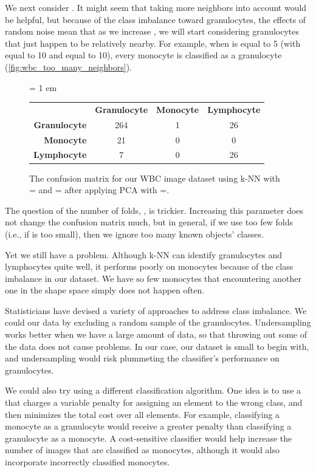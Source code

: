 We next consider . It might seem that taking more neighbors into account would be helpful, but because of the class imbalance toward granulocytes, the effects of random noise mean that as we increase , we will start considering granulocytes that just happen to be relatively nearby. For example, when  is equal to 5 (with  equal to 10 and  equal to 10), every monocyte is classified as a granulocyte (\autoref{fig:wbc_too_many_neighbors}).\\

\begin{figure}[h]
\centering
\tabcolsep = 1 em
\mySfFamily
{}
\begin{tabular}{r c c c}
\rowcolor{gray!50}
& \textbf{Granulocyte} & \textbf{Monocyte} & \textbf{Lymphocyte} \\
\textbf{Granulocyte} & 264 & 1 & 26 \\
\textbf{Monocyte} & \phantom{5}21 & 0 & \phantom{5}0 \\
\textbf{Lymphocyte} & \phantom{55}7 & 0 & 26
\end{tabular}
\caption{The confusion matrix for our WBC image dataset using k-NN with = and = after applying PCA with =.}
\label{fig:wbc_too_many_neighbors}
\end{figure}

The question of the number of folds, , is trickier. Increasing this parameter does not change the confusion matrix much, but in general, if we use too few folds (i.e., if  is too small), then we ignore too many known objects' classes.

Yet we still have a problem. Although k-NN can identify granulocytes and lymphocytes quite well, it performs poorly on monocytes because of the class imbalance in our dataset. We have so few monocytes that encountering another one in the shape space simply does not happen often.

Statisticians have devised a variety of approaches to address class imbalance. We could  our data by excluding a random sample of the granulocytes. Undersampling works better when we have a large amount of data, so that throwing out some of the data does not cause problems. In our case, our dataset is small to begin with, and undersampling would risk plummeting the classifier's performance on granulocytes.

We could also try using a different classification algorithm. One idea is to use a  that charges a variable penalty for assigning an element to the wrong class, and then minimizes the total cost over all elements. For example, classifying a monocyte as a granulocyte would receive a greater penalty than classifying a granulocyte as a monocyte. A cost-sensitive classifier would help increase the number of images that are classified as monocytes, although it would also incorporate incorrectly classified monocytes.

